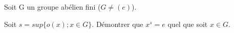 Soit G un groupe abélien fini ($G\neq (e)$).

Soit $s=sup\{o(x);x\in G\}.$ Démontrer que $x^s = e$ quel que soit $x\in G$.